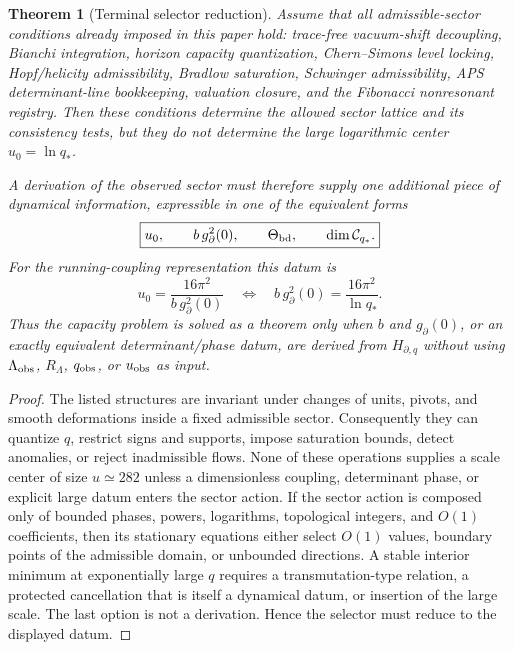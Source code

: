 \documentclass[aps,prd,reprint,nofootinbib,superscriptaddress,floatfix]{revtex4-2}
\numberwithin{equation}{section}
\theoremstyle{definition}
\theoremstyle{plain}
\newtheorem{theorem}{Theorem}[section]
\begin{document}
\begin{theorem}[Terminal selector reduction]\label{thm:terminal-selector-reduction}
Assume that all admissible-sector conditions already imposed in this
paper hold: trace-free vacuum-shift decoupling, Bianchi integration,
horizon capacity quantization, Chern--Simons level locking, Hopf/helicity
admissibility, Bradlow saturation, Schwinger admissibility, APS
determinant-line bookkeeping, valuation closure, and the Fibonacci
nonresonant registry.  Then these conditions determine the allowed
sector lattice and its consistency tests, but they do not determine the
large logarithmic center \(u_0=\ln q_*\).

A derivation of the observed sector must therefore supply one additional
piece of dynamical information, expressible in one of the equivalent
forms
\begin{equation}
\boxed{
        u_0,\qquad
        b\,g_\partial^2(0),\qquad
        \Theta_{\rm bd},\qquad
        \dim\mathcal C_{q_*}.
}
\end{equation}
For the running-coupling representation this datum is
\begin{equation}
\boxed{
        u_0=\frac{16\pi^2}{b\,g_\partial^2(0)}
        \quad\Longleftrightarrow\quad
        b\,g_\partial^2(0)
        =
        \frac{16\pi^2}{\ln q_*}.
}
\end{equation}
Thus the capacity problem is solved as a theorem only when
\(b\) and \(g_\partial(0)\), or an exactly equivalent determinant/phase
datum, are derived from \(H_{\partial,q}\) without using
\(\Lambda_{\rm obs}\), \(R_\Lambda\), \(q_{\rm obs}\), or \(u_{\rm obs}\)
as input.
\end{theorem}

\begin{proof}
The listed structures are invariant under changes of units, pivots, and
smooth deformations inside a fixed admissible sector.  Consequently they
can quantize \(q\), restrict signs and supports, impose saturation
bounds, detect anomalies, or reject inadmissible flows.  None of these
operations supplies a scale center of size
\(u\simeq 282\) unless a dimensionless coupling, determinant phase, or
explicit large datum enters the sector action.  If the sector action is
composed only of bounded phases, powers, logarithms, topological
integers, and \(O(1)\) coefficients, then its stationary equations either
select \(O(1)\) values, boundary points of the admissible domain, or
unbounded directions.  A stable interior minimum at exponentially large
\(q\) requires a transmutation-type relation, a protected cancellation
that is itself a dynamical datum, or insertion of the large scale.  The
last option is not a derivation.  Hence the selector must reduce to the
displayed datum.
\end{proof}
\end{document}
